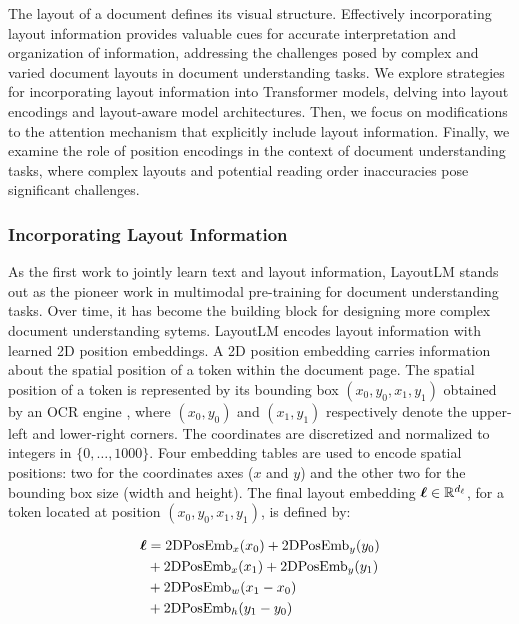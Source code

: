 The layout of a document defines its visual structure. Effectively incorporating layout information provides valuable cues for accurate interpretation and organization of information, addressing the challenges posed by complex and varied document layouts in document understanding tasks. We explore strategies for incorporating layout information into Transformer models, delving into layout encodings and layout-aware model architectures. Then, we focus on modifications to the attention mechanism that explicitly include layout information. Finally, we examine the role of position encodings in the context of document understanding tasks, where complex layouts and potential reading order inaccuracies pose significant challenges.

\subsubsection{Incorporating Layout Information} 
\label{section:related-document-understanding-layout-encoding}

As the first work to jointly learn text and layout information, LayoutLM \citep{xu2020layoutlm} stands out as the pioneer work in multimodal pre-training for document understanding tasks. Over time, it has become the building block for designing more complex document understanding sytems. LayoutLM encodes layout information with learned 2D position embeddings. A 2D position embedding carries information about the spatial position of a token within the document page. The spatial position of a token is represented by its bounding box $(x_0, y_0, x_1, y_1)$ obtained by an \ac{OCR} engine \citep{kay2007tesseract}, where $(x_0, y_0)$ and $(x_1, y_1)$ respectively denote the upper-left and lower-right corners. The coordinates are discretized and normalized to integers in $\{0, \ldots, 1000\}$. Four embedding tables are used to encode spatial positions: two for the coordinates axes ($x$ and $y$) and the other two for the bounding box size (width and height). The final layout embedding $\boldsymbol{\ell} \in \mathbb{R}^{d_{\ell}}$, for a token located at position $(x_0, y_0, x_1, y_1)$, is defined by:

\begin{equation}
\begin{split}
    \boldsymbol{\ell} & = \text{2DPosEmb}_x(x_0) + \text{2DPosEmb}_y(y_0) \\
    & + \text{2DPosEmb}_x(x_1) + \text{2DPosEmb}_y(y_1) \\
    & + \text{2DPosEmb}_w(x_1 - x_0) \\
    & + \text{2DPosEmb}_h(y_1 - y_0) \\
\end{split}
\end{equation}

